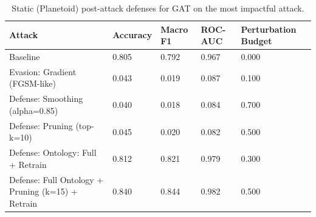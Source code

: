 \begin{table}[t]
\centering
\small
\begin{tabular}{lllll}
\toprule
Attack & Accuracy & Macro F1 & ROC-AUC & Perturbation Budget \\
\midrule
Baseline & 0.805 & 0.792 & 0.967 & 0.000 \\
Evasion: Gradient (FGSM-like) & 0.043 & 0.019 & 0.087 & 0.100 \\
Defense: Smoothing (alpha=0.85) & 0.040 & 0.018 & 0.084 & 0.700 \\
Defense: Pruning (top-k=10) & 0.045 & 0.020 & 0.082 & 0.500 \\
Defense: Ontology: Full + Retrain & 0.812 & 0.821 & 0.979 & 0.300 \\
Defense: Full Ontology + Pruning (k=15) + Retrain & 0.840 & 0.844 & 0.982 & 0.500 \\
\bottomrule
\end{tabular}

\caption{Static (Planetoid) post-attack defenses for GAT on the most impactful attack.}
\label{tab:static_gat_defenses}
\end{table}
